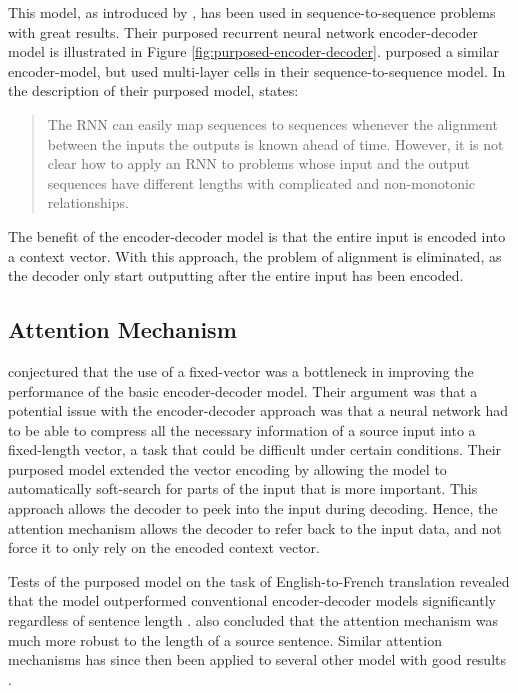 This model, as introduced by \citep{cho2014learning}, has been used in sequence-to-sequence problems with great results. Their purposed recurrent neural network encoder-decoder model is illustrated in Figure \ref{fig:purposed-encoder-decoder}. \citep{sutskever2014sequence} purposed a similar encoder-model, but used multi-layer cells in their sequence-to-sequence model. In the description of their purposed model, \citep{sutskever2014sequence} states:

\begin{quote}
    The RNN can easily map sequences to sequences whenever the alignment between the inputs the outputs is known ahead of time. However, it is not clear how to apply an RNN to problems whose input and the output sequences have different lengths with complicated and non-monotonic relationships.
\end{quote}

The benefit of the encoder-decoder model is that the entire input is encoded into a context vector. With this approach, the problem of alignment is eliminated, as the decoder only start outputting after the entire input has been encoded.

\subsection{Attention Mechanism}
\label{sec:attention_mechanism}
\citep{bahdanau2014neural} conjectured that the use of a fixed-vector was a bottleneck in improving the performance of the basic encoder-decoder model. Their argument was that a potential issue with the encoder-decoder approach was that a neural network had to be able to compress all the necessary information of a source input into a fixed-length vector, a task that could be difficult under certain conditions. Their purposed model extended the vector encoding by allowing the model to automatically soft-search for parts of the input that is more important. This approach allows the decoder to peek into the input during decoding. Hence, the attention mechanism allows the decoder to refer back to the input data, and not force it to only rely on the encoded context vector. 

Tests of the purposed model on the task of English-to-French translation revealed that the model outperformed conventional encoder-decoder models significantly regardless of sentence length \citep{bahdanau2014neural}. \citep{bahdanau2014neural} also concluded that the attention mechanism was much more robust to the length of a source sentence. Similar attention mechanisms has since then been applied to several other model with good results \citep{hsu2016recurrent, sankaran2016temporal}. 

